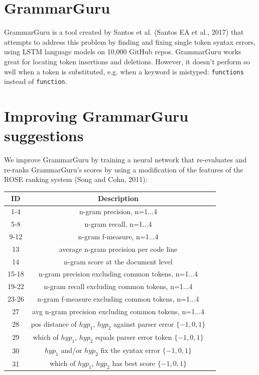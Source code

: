 \documentclass[a0,portrait]{a0poster}
\begin{document}
\begin{multicols}{2}

\color{Navy}
\section*{GrammarGuru}

GrammarGuru is a tool created by Santos et al. (Santos EA et al., 2017) that attempts to address this problem by finding and fixing single token syntax errors, using LSTM language models on 10,000 GitHub repos. GrammarGuru works great for locating token insertions and deletions. However, it doesn't perform so well when a token is substituted, e.g. when a keyword is mistyped: \texttt{functions} instead of \texttt{function}.


\section*{Improving GrammarGuru suggestions}

 We improve GrammarGuru by training a neural network that re-evaluates and re-ranks GrammarGuru's scores by using a modification of the features of the ROSE ranking system (Song and Cohn, 2011):

\color{Black}
\begin{center}
\begin{tabular}{ |c|c|c| }
 \hline
 \textbf{ID} & \textbf{Description}\\
 \hline
 1-4 & n-gram precision, n=1...4\\
 5-8 & n-gram recall, n=1...4 \\
 9-12 & n-gram f-measure, n=1...4 \\
 13 & average n-gram precision per code line\\
 14 & n-gram score at the document level \\
 15-18 & n-gram precision excluding common tokens, n=1...4\\
 19-22 & n-gram recall excluding common tokens, n=1...4\\
 23-26 & n-gram f-measure excluding common tokens, n=1...4\\
 27 & avg n-gram precision excluding common tokens, n=1...4\\
 28 & pos distance of $hyp_1$, $hyp_2$ against parser error $\{-1, 0, 1 \}$\\
 29 & which of $hyp_1$, $hyp_2$ equals parser error token $\{ -1, 0, 1\}$\\
 30 & $hyp_1$ and/or $hyp_2$ fix the syntax error $\{ -1, 0, 1\}$ \\
 31 & which of $hyp_1$, $hyp_2$ has best score $\{-1, 0, 1\}$\\
 \hline
\end{tabular}
\end{center}


\end{multicols}
\end{document}
